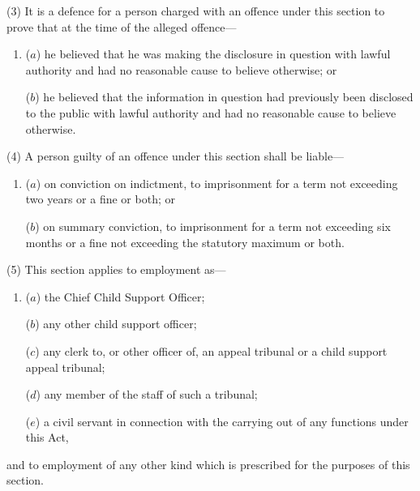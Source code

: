 \documentclass[12pt,a4paper]{article}
\begin{document}
(3) It is a defence for a person charged with an offence under this section to prove that at the time of the alleged offence—
\begin{enumerate}\item[]
($a$) he believed that he was making the disclosure in question with lawful authority and had no reasonable cause to believe otherwise; or

($b$) he believed that the information in question had previously been disclosed to the public with lawful authority and had no reasonable cause to believe otherwise.
\end{enumerate}

(4) A person guilty of an offence under this section shall be liable—
\begin{enumerate}\item[]
($a$) on conviction on indictment, to imprisonment for a term not exceeding two years or a fine or both; or

($b$) on summary conviction, to imprisonment for a term not exceeding six months or a fine not exceeding the statutory maximum or both.
\end{enumerate}

(5) This section applies to employment as—
\begin{enumerate}\item[]
($a$) the Chief Child Support Officer;

($b$) any other child support officer;

($c$) any clerk to, or other officer of, 
an appeal tribunal or  %
a child support appeal tribunal;

($d$) any member of the staff of such a tribunal;

($e$) a civil servant in connection with the carrying out of any functions under this Act,
\end{enumerate}
and to employment of any other kind which is prescribed for the purposes of this section.
\end{document}
